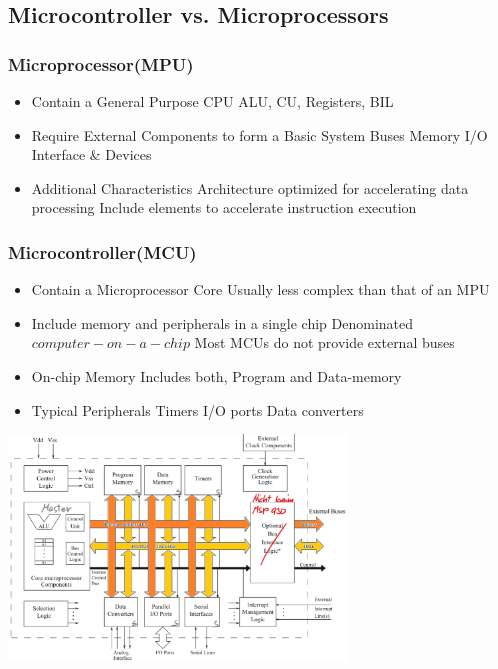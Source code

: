 \subsection{Microcontroller vs. Microprocessors }
\begin{multicols}{2}
		\subsubsection{Microprocessor(MPU) }
		\begin{itemize}
			\item Contain a General Purpose CPU
			\subitem ALU, CU, Registers, BIL %
			\item Require External Components to form a Basic System
			\subitem Buses
			\subitem Memory
			\subitem I/O Interface \& Devices
			\item Additional Characteristics
			\subitem Architecture optimized for accelerating data processing
			\subitem Include elements to accelerate instruction execution  
		\end{itemize}
\subsubsection{Microcontroller(MCU)}
		\begin{itemize}
			\item Contain a Microprocessor Core
			\subitem Usually less complex than that of an MPU
			\item Include memory and peripherals in a single chip
			\subitem Denominated $ computer-on-a-chip $ 
			\subitem Most MCUs do not provide external buses
			\item On-chip Memory
			\subitem Includes both, Program and Data-memory
			\item Typical Peripherals
			\subitem Timers
			\subitem I/O ports
			\subitem Data converters
		\end{itemize}
\end{multicols}
\begin{center}
	\includegraphics[width=9cm]{images/mCStructure}
\end{center}
\pagebreak

